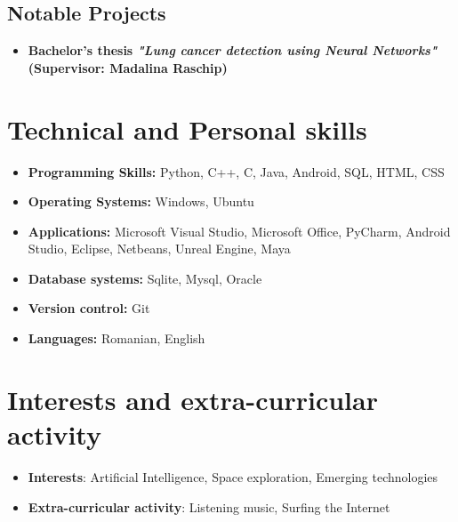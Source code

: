 \documentclass[10pt,a4paper,sans]{moderncv}
\begin{document}
		\vspace{5pt}
		\subsection{Notable Projects}
			
			\begin{itemize}
				\vspace{2pt}
				\item{\textbf{Bachelor's thesis \textit{"Lung cancer detection using Neural Networks"}  (Supervisor: Madalina Raschip) }\textit{}}
				\vspace{2pt}
				\small{}
			\end{itemize}
			

	\section{Technical and Personal skills}
		\begin{itemize}

			\vspace{5pt}
			\item \textbf{Programming Skills:}  Python, C++, C, Java, Android, SQL, HTML, CSS
			
			\vspace{2pt}
			\item \textbf{Operating Systems:} Windows, Ubuntu
			
			\vspace{2pt}
			\item \textbf{Applications:} Microsoft Visual Studio, Microsoft Office, PyCharm, Android Studio, Eclipse, Netbeans, Unreal Engine, Maya
			
			\vspace{2pt}
			\item \textbf{Database systems:} Sqlite, Mysql, Oracle
			
			\vspace{2pt}
			\item \textbf{Version control:} Git
			
			\vspace{2pt}
			\item \textbf{Languages:} Romanian, English
			
		\end{itemize}
	
	\section{Interests and extra-curricular activity}
		\begin{itemize}
			\vspace{5pt}
			\item \textbf{Interests}: Artificial Intelligence, Space exploration, Emerging technologies
			\vspace{2pt}
			\item \textbf{Extra-curricular activity}: Listening music, Surfing the Internet
		\end{itemize}
	
\end{document}

